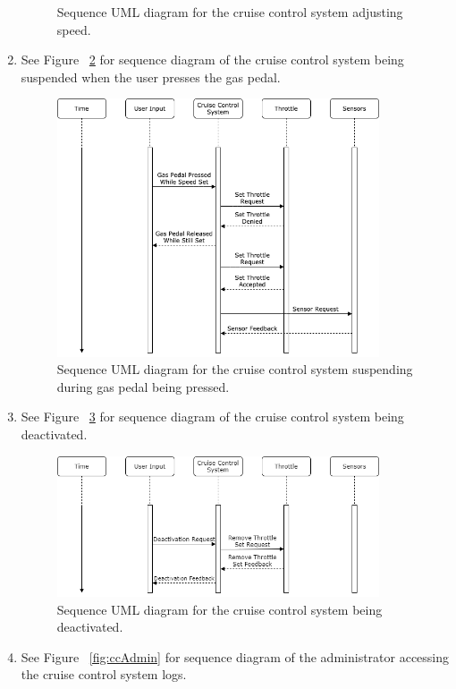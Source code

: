 \documentclass[preprint,11pt,3p]{article}
\begin{document}
\begin{enumerate}
\begin{figure}[H]
			\caption{Sequence UML diagram for the cruise control system adjusting speed.}
			\label{fig:ccAdjust}
		\end{figure}
		\newpage
	\item See Figure ~\ref{fig:ccGas} for sequence diagram of the cruise control system being suspended when the user presses the gas pedal.
		\begin{figure}[H]
			\includegraphics[width=0.9\textwidth]{images/gasPedalPressedSequence.png}
			\caption{Sequence UML diagram for the cruise control system suspending during gas pedal being pressed.}
			\label{fig:ccGas}
		\end{figure}
		\newpage
	\item See Figure ~\ref{fig:ccDeactivate} for sequence diagram of the cruise control system being deactivated.
		\begin{figure}[H]
			\includegraphics[width=0.9\textwidth]{images/deactivation.png}
			\caption{Sequence UML diagram for the cruise control system being deactivated.}
			\label{fig:ccDeactivate}
		\end{figure}
		\newpage
	\item See Figure ~\ref{fig:ccAdmin} for sequence diagram of the administrator accessing the cruise control system logs.

\end{enumerate}
\end{document}
